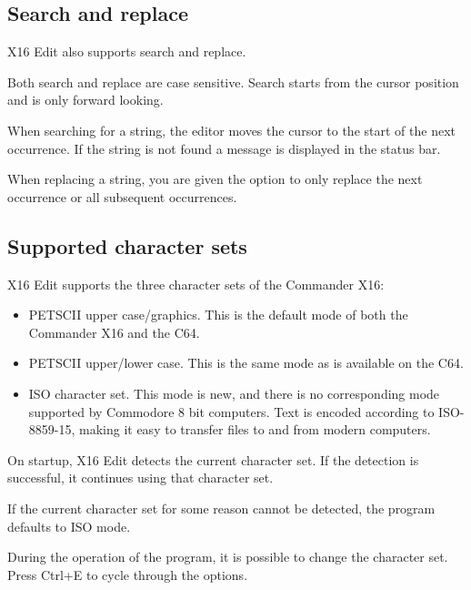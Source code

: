 \documentclass{article}
\begin{document}
    \subsection{Search and replace}

        X16 Edit also supports search and replace.

        Both search and replace are case sensitive. Search starts from the
        cursor position and is only forward looking.

        When searching for a string, the editor moves the cursor to the start
        of the next occurrence. If the string is not found a message is
        displayed in the status bar.

        When replacing a string, you are given the option to only replace the
        next occurrence or all subsequent occurrences.

    \subsection{Supported character sets}

        X16 Edit supports the three character sets of the Commander X16:

        \begin{itemize}
            \item PETSCII upper case/graphics. This is the default mode of both the Commander X16 and the C64.

            \item PETSCII upper/lower case. This is the same mode as is available on the C64.

            \item ISO character set. This mode is new, and there is no corresponding mode supported by 
            Commodore 8 bit computers. Text is encoded according to ISO-8859-15, making it
            easy to transfer files to and from modern computers.
        \end{itemize}

        \noindent On startup, X16 Edit detects the current character set. If the detection is successful, it
        continues using that character set.

        If the current character set for some reason cannot be detected, the program defaults to ISO mode.

        During the operation of the program, it is possible to change the character set. Press Ctrl+E to cycle
        through the options.
\end{document}
